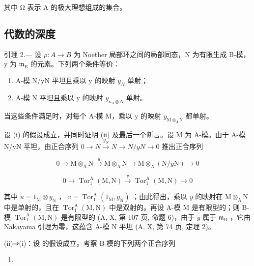 其中 Ω 表示 A 的极大理想组成的集合。

\subsection{代数的深度}

引理 2.--- 设 \(\rho: A \to B\) 为 Noether 局部环之间的局部同态，N 为有限生成 B-模，y 为 \(\mathfrak{m}_{\mathrm{B}}\) 的元素。下列两个条件等价：

\begin{enumerate}
\def\labelenumi{(\roman{enumi})}
\item
  A-模 N/yN 平坦且乘以 y 的映射 \(y_{N}\) 单射；
\item
  A-模 N 平坦且乘以 y 的映射 \(y_{\kappa_{A}\otimes N}\) 单射。
\end{enumerate}

当这些条件满足时，对每个 A-模 M，乘以 y 的映射 \(y_{\mathrm{M} \otimes_{\Lambda}\mathrm{N}}\) 都单射。

设 (i) 的假设成立，并同时证明 (ii) 及最后一个断言。设 M 为 A-模。由于 A-模 N/yN 平坦，由正合序列 \(0 \rightarrow N \xrightarrow{y_{N}} N \longrightarrow N/yN \rightarrow 0\) 推出正合序列

\[
0 \rightarrow \mathrm{M} \otimes_ {\mathrm{A}} \mathrm{N} \xrightarrow {u} \mathrm{M} \otimes_ {\mathrm{A}} \mathrm{N} \longrightarrow \mathrm{M} \otimes_ {\mathrm{A}} (\mathrm{N} / y \mathrm{N}) \rightarrow 0
\]

\[
0 \to \operatorname{Tor} _ {1} ^ {\mathrm{A}} (\mathrm{M}, \mathrm{N}) \stackrel {v} {\longrightarrow} \operatorname{Tor} _ {1} ^ {\mathrm{A}} (\mathrm{M}, \mathrm{N}) \to 0
\]

其中 \(u = 1_{\mathrm{M}} \otimes y_{\mathrm{N}}\) ， \(v = \operatorname{Tor}_1^{\mathrm{A}}(1_{\mathrm{M}}, y_{\mathrm{N}})\) ；由此得出，乘以 \(y\) 的映射在 \(\mathrm{M} \otimes_{\mathrm{A}} \mathrm{N}\) 中是单射的，且在 \(\operatorname{Tor}_1^{\mathrm{A}}(\mathrm{M}, \mathrm{N})\) 中是双射的。再设 A-模 \(\mathrm{M}\) 是有限型的；则 B-模 \(\operatorname{Tor}_1^{\mathrm{A}}(\mathrm{M}, \mathrm{N})\) 是有限型的 (A, X, 第 107 页, 命题 6)，由于 \(y\) 属于 \(\mathfrak{m}_{\mathrm{B}}\) ，它由 Nakayama 引理为零，这蕴含 A-模 \(\mathrm{N}\) 平坦 (A, X, 第 74 页, 定理 2)。

(ii)⇒(i)：设 的假设成立。考察 B-模的下列两个正合序列

\begin{enumerate}
\def\labelenumi{(\arabic{enumi})}
\tightlist
\item
\end{enumerate}

